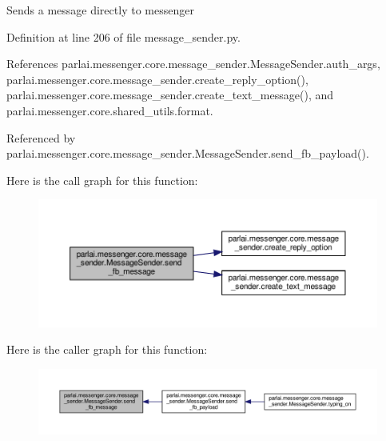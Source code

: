 \begin{DoxyVerb}Sends a message directly to messenger\end{DoxyVerb}
 

Definition at line 206 of file message\+\_\+sender.\+py.



References parlai.\+messenger.\+core.\+message\+\_\+sender.\+Message\+Sender.\+auth\+\_\+args, parlai.\+messenger.\+core.\+message\+\_\+sender.\+create\+\_\+reply\+\_\+option(), parlai.\+messenger.\+core.\+message\+\_\+sender.\+create\+\_\+text\+\_\+message(), and parlai.\+messenger.\+core.\+shared\+\_\+utils.\+format.



Referenced by parlai.\+messenger.\+core.\+message\+\_\+sender.\+Message\+Sender.\+send\+\_\+fb\+\_\+payload().

Here is the call graph for this function\+:
\nopagebreak
\begin{figure}[H]
\begin{center}
\leavevmode
\includegraphics[width=350pt]{classparlai_1_1messenger_1_1core_1_1message__sender_1_1MessageSender_ac323160e9bbb201ed0c64b819f1c78ca_cgraph}
\end{center}
\end{figure}
Here is the caller graph for this function\+:
\nopagebreak
\begin{figure}[H]
\begin{center}
\leavevmode
\includegraphics[width=350pt]{classparlai_1_1messenger_1_1core_1_1message__sender_1_1MessageSender_ac323160e9bbb201ed0c64b819f1c78ca_icgraph}
\end{center}
\end{figure}
\mbox{\label{classparlai_1_1messenger_1_1core_1_1message__sender_1_1MessageSender_a8bc08e730c5d1fbe4c4cc0d96746b30a}} 
